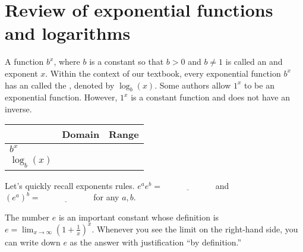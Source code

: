 \documentclass[../main.tex]{subfiles}
\begin{document}
 \section{Review of exponential functions and logarithms}
A function \(b^{x}\), where \(b\) is a constant so that \(b > 0\) and \(b \ne 1\) is called an  and exponent \(x\). Within the context of our textbook, every exponential function \(b^{x}\) has an  called the , denoted by \(\log_{b}(x)\). \newline
{\scriptsize Some authors allow \(1^{x}\) to be an exponential function. However, \(1^{x}\) is a constant function and does not have an inverse.}

\begin{minipage}{0.6\textwidth}
  \centering
  \begin{tabular}{l|p{1in}|p{1in}}
    & Domain & Range \\\midrule
    \(b^{x}\) & & \\[2ex]\midrule
    \(\log_{b}(x)\) & & \\[2ex]
  \end{tabular}
\end{minipage}
\begin{minipage}{0.4\textwidth}
  \centering
  
\end{minipage}

Let's quickly recall exponents rules. \(e^{a}e^{b} = \underline{\hspace{1in}}\) and \((e^{a})^{b} = \underline{\hspace{1in}}\) for any \(a,b\).

The number \(e\) is an important constant whose definition is \(e = \lim_{x \to \infty} \left( 1 + \frac{1}{x} \right)^{x}\). Whenever you see the limit on the right-hand side, you can write down \(e\) as the answer with justification ``by definition.'' 
\bigskip
\end{document}
